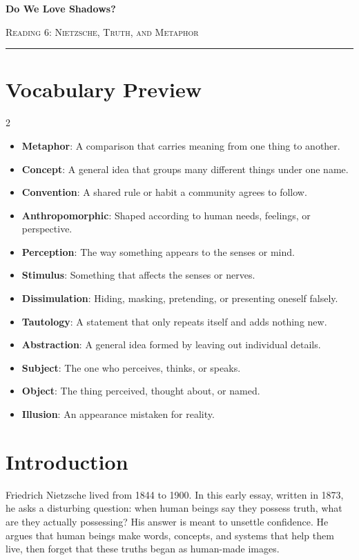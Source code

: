 \documentclass[12pt]{article}
\begin{document}
\begin{center}
{\LARGE\bfseries Do We Love Shadows?}\par\vspace{0.25em}
{\large\scshape Reading 6: Nietzsche, Truth, and Metaphor}\par\vspace{0.45em}
\rule{0.82\textwidth}{0.4pt}\par\vspace{0.7em}
\end{center}

\section*{Vocabulary Preview}
\begin{multicols}{2}
\begin{itemize}[leftmargin=*, itemsep=0.18em]
\item \textbf{Metaphor}: A comparison that carries meaning from one thing to another.
\item \textbf{Concept}: A general idea that groups many different things under one name.
\item \textbf{Convention}: A shared rule or habit a community agrees to follow.
\item \textbf{Anthropomorphic}: Shaped according to human needs, feelings, or perspective.
\item \textbf{Perception}: The way something appears to the senses or mind.
\item \textbf{Stimulus}: Something that affects the senses or nerves.
\item \textbf{Dissimulation}: Hiding, masking, pretending, or presenting oneself falsely.
\item \textbf{Tautology}: A statement that only repeats itself and adds nothing new.
\item \textbf{Abstraction}: A general idea formed by leaving out individual details.
\item \textbf{Subject}: The one who perceives, thinks, or speaks.
\item \textbf{Object}: The thing perceived, thought about, or named.
\item \textbf{Illusion}: An appearance mistaken for reality.
\end{itemize}
\end{multicols}

\section*{Introduction}
Friedrich Nietzsche lived from 1844 to 1900. In this early essay, written in 1873, he asks a disturbing question: when human beings say they possess truth, what are they actually possessing? His answer is meant to unsettle confidence. He argues that human beings make words, concepts, and systems that help them live, then forget that these truths began as human-made images.
\end{document}
